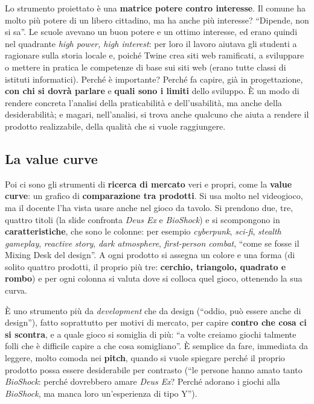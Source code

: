 Lo strumento proiettato è una \textbf{matrice potere contro interesse}. Il comune ha molto
più potere di un libero cittadino, ma ha anche più interesse? ``Dipende, non si sa''. Le
scuole avevano un buon potere e un ottimo interesse, ed erano quindi nel quadrante
\emph{high power, high interest}: per loro il lavoro aiutava gli studenti a ragionare
sulla storia locale e, poiché Twine crea siti web ramificati, a sviluppare o mettere in
pratica le competenze di base sui siti web (erano tutte classi di istituti informatici).
Perché è importante? Perché fa capire, già in progettazione, \textbf{con chi si dovrà
parlare} e \textbf{quali sono i limiti} dello sviluppo. È un modo di rendere concreta
l'analisi della praticabilità e dell'usabilità, ma anche della desiderabilità; e magari,
nell'analisi, si trova anche qualcuno che aiuta a rendere il prodotto realizzabile, della
qualità che si vuole raggiungere.

\subsection{La value curve}



Poi ci sono gli strumenti di \textbf{ricerca di mercato} veri e propri, come la
\textbf{value curve}: un grafico di \textbf{comparazione tra prodotti}. Si usa molto nel
videogioco, ma il docente l'ha vista usare anche nel gioco da tavolo. Si prendono due,
tre, quattro titoli (la slide confronta \emph{Deus Ex} e \emph{BioShock}) e si scompongono
in \textbf{caratteristiche}, che sono le colonne: per esempio \emph{cyberpunk},
\emph{sci-fi}, \emph{stealth gameplay}, \emph{reactive story}, \emph{dark atmosphere},
\emph{first-person combat}, ``come se fosse il Mixing Desk del design''. A ogni prodotto si
assegna un colore e una forma (di solito quattro prodotti, il proprio più tre:
\textbf{cerchio, triangolo, quadrato e rombo}) e per ogni colonna si valuta dove si colloca
quel gioco, ottenendo la sua curva.

È uno strumento più da \emph{development} che da design (``oddio, può essere anche di
design''), fatto soprattutto per motivi di mercato, per capire \textbf{contro che cosa ci
si scontra}, e a quale gioco si somiglia di più: ``a volte creiamo giochi talmente folli
che è difficile capire a che cosa somigliano''. È semplice da fare, immediata da leggere,
molto comoda nei \textbf{pitch}, quando si vuole spiegare perché il proprio prodotto possa
essere desiderabile per contrasto (``le persone hanno amato tanto \emph{BioShock}:
perché dovrebbero amare \emph{Deus Ex}? Perché adorano i giochi alla \emph{BioShock}, ma
manca loro un'esperienza di tipo Y'').

